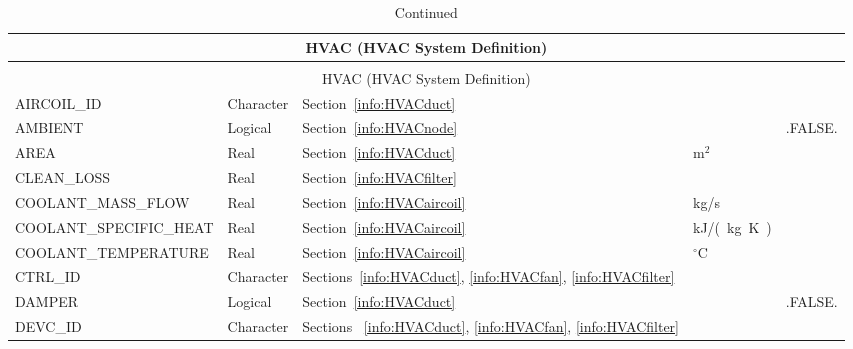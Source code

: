 \documentclass[11pt]{book}
\begin{document}
\begin{longtable}{@{\extracolsep{\fill}}|l|l|l|l|l|}
\caption[HVAC parameters ({\ct HVAC} namelist group)]{For more information see Section~\ref{info:HVAC}.}
\label{tbl:HVAC} \\
\hline
\multicolumn{5}{|c|}{{\ct HVAC} (HVAC System Definition)} \\
\hline \hline
\endfirsthead
\caption[]{Continued} \\
\hline
\multicolumn{5}{|c|}{{\ct HVAC} (HVAC System Definition)} \\
\hline \hline
\endhead
{\ct AIRCOIL\_ID}               & Character         & Section~\ref{info:HVACduct}                                                   &               &                \\ \hline
{\ct AMBIENT}                   & Logical           & Section~\ref{info:HVACnode}                                                   &               & {\ct .FALSE.}  \\ \hline
{\ct AREA}                      & Real              & Section~\ref{info:HVACduct}                                                   & m$^2$         &                \\ \hline
{\ct CLEAN\_LOSS}               & Real              & Section~\ref{info:HVACfilter}                                                 &               &                \\ \hline
{\ct COOLANT\_MASS\_FLOW}       & Real              & Section~\ref{info:HVACaircoil}                                                & kg/s          &                \\ \hline
{\ct COOLANT\_SPECIFIC\_HEAT}   & Real              & Section~\ref{info:HVACaircoil}                                                & \si{kJ/(kg.K)} &               \\ \hline
{\ct COOLANT\_TEMPERATURE}      & Real              & Section~\ref{info:HVACaircoil}                                                & $^\circ$C     &                \\ \hline
{\ct CTRL\_ID}                  & Character         & Sections~\ref{info:HVACduct}, \ref{info:HVACfan}, \ref{info:HVACfilter}       &               &                \\ \hline
{\ct DAMPER}                    & Logical           & Section~\ref{info:HVACduct}                                                   &               & {\ct .FALSE.}  \\ \hline
{\ct DEVC\_ID}                  & Character         & Sections ~\ref{info:HVACduct}, \ref{info:HVACfan}, \ref{info:HVACfilter}      &               &                \\ \hline

\end{longtable}
\end{document}
